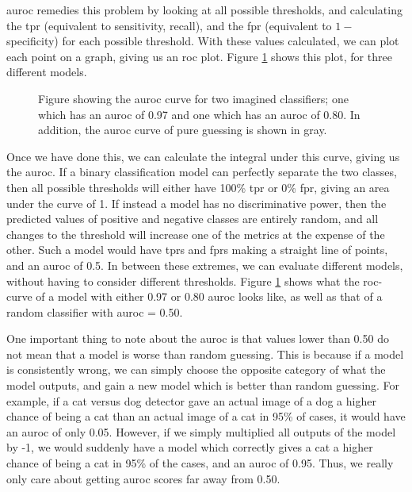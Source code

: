 \documentclass[UKenglish]{uiomasterthesis} %
\theoremstyle{definition}
\begin{document}
\ac{auroc} remedies this problem by looking at all possible thresholds, and calculating the \ac{tpr} (equivalent to sensitivity, recall), and the \ac{fpr} (equivalent to $1 -$ specificity) for each possible threshold. With these values calculated, we can plot each point on a graph, giving us an \ac{roc} plot. Figure \ref{fig:auroc} shows this plot, for three different models.

\begin{figure}[H]
    \begin{center}
        
    \end{center}
    \caption[AUROC example figure]{Figure showing the \ac{auroc} curve for two imagined classifiers; one which has an \ac{auroc} of 0.97 and one which has an \ac{auroc} of 0.80. In addition, the \ac{auroc} curve of pure guessing is shown in gray.}
    \label{fig:auroc}
\end{figure}

Once we have done this, we can calculate the integral under this curve, giving us the \ac{auroc}. If a binary classification model can perfectly separate the two classes, then all possible thresholds will either have 100\% \ac{tpr} or 0\% \ac{fpr}, giving an area under the curve of 1. If instead a model has no discriminative power, then the predicted values of positive and negative classes are entirely random, and all changes to the threshold will increase one of the metrics at the expense of the other. Such a model would have \acp{tpr} and \acp{fpr} making a straight line of points, and an \ac{auroc} of 0.5. In between these extremes, we can evaluate different models, without having to consider different thresholds. Figure \ref{fig:auroc} shows what the \ac{roc}-curve of a model with either 0.97 or 0.80 \ac{auroc} looks like, as well as that of a random classifier with \ac{auroc} = 0.50. 

One important thing to note about the \ac{auroc} is that values lower than 0.50 do not mean that a model is worse than random guessing. This is because if a model is consistently wrong, we can simply choose the opposite category of what the model outputs, and gain a new model which is better than random guessing. For example, if a cat versus dog detector gave an actual image of a dog a higher chance of being a cat than an actual image of a cat in 95\% of cases, it would have an \ac{auroc} of only 0.05. However, if we simply multiplied all outputs of the model by -1, we would suddenly have a model which correctly gives a cat a higher chance of being a cat in 95\% of the cases, and an \ac{auroc} of 0.95. Thus, we really only care about getting \ac{auroc} scores far away from 0.50.\\
\end{document}
